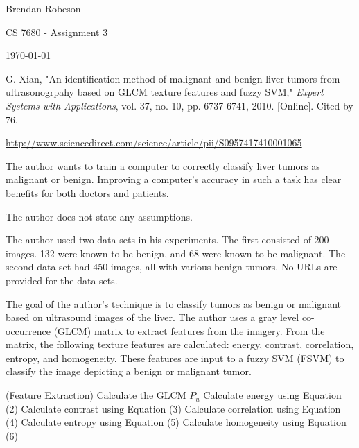\documentclass[11pt]{article}
\begin{document}
\noindent Brendan Robeson

\noindent CS 7680 - Assignment 3

\noindent \today

\medskip

\begin{description}[leftmargin=0in]
    \item [Source] G. Xian, "An identification method of malignant and benign
        liver tumors from ultrasonogrpahy based on GLCM texture features and
        fuzzy SVM," \emph{Expert Systems with Applications}, vol. 37, no. 10,
        pp. 6737-6741, 2010. [Online]. Cited by 76.

    \item [URL]
        \url{http://www.sciencedirect.com/science/article/pii/S0957417410001065}

    \item [Problem] The author wants to train a computer to correctly classify
        liver tumors as malignant or benign. Improving a computer's accuracy in
        such a task has clear benefits for both doctors and patients.

    \item [Assumptions] The author does not state any assumptions.

    \item [Data Sets] The author used two data sets in his experiments. The
        first consisted of 200 images. 132 were known to be benign, and 68 were
        known to be malignant. The second data set had 450 images, all with
        various benign tumors. No URLs are provided for the data sets. 

    \item [Algorithm Overview] The goal of the author's technique is to classify
        tumors as benign or malignant based on ultrasound images of the liver.
        The author uses a gray level co-occurrence (GLCM) matrix to extract features
        from the imagery. From the matrix, the following texture features are
        calculated: energy, contrast, correlation, entropy, and homogeneity.
        These features are input to a fuzzy SVM (FSVM) to classify the image
        depicting a benign or malignant tumor.

        \begin{algorithm}
            \Begin(Feature Extraction)
            {
                {
                    Calculate the GLCM $P_u$\;
                    Calculate energy using Equation (2)\;
                    Calculate contrast using Equation (3)\;
                    Calculate correlation using Equation (4)\;
                    Calculate entropy using Equation (5)\;
                    Calculate homogeneity using Equation (6)\;
                }
            }
        \end{algorithm}


\end{description}
\end{document}
